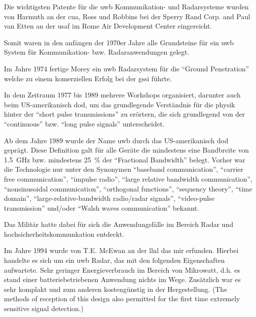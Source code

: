 Die wichtigsten Patente für die \ac{uwb} Kommunikation- und Radarsysteme wurden von Harmuth an der \ac{cua}, Ross und Robbins bei der Sperry Rand Corp. and Paul van Etten an der \ac{usaf} im Rome Air Development Center eingereicht. \cite{barrett2001technical}

\begin{comment}
Rome Laboratory (Rome Air Development Center until 1991) is the US "Air Force 'superlab' for command, control, and communications"[4] research and development and is responsible for planning and executing the USAF science and technology program.
\end{comment}

Somit waren in den anfängen der 1970er Jahre alle Grundsteine für ein \ac{uwb} System für Kommunikation- bzw. Radaranwendungen gelegt.\cite{barrett2001technical}

Im Jahre 1974 fertige Morey ein \ac{uwb} Radarsystem für die ``Ground Penetration'' welche zu einem komerziellen Erfolg bei der \ac{gssi} führte. \cite{barrett2001technical}

In dem Zeitraum 1977 bis 1989 mehrere Workshops organisiert, darunter auch beim US-ame­ri­ka­nisch \ac{dod}, um das grundlegende Verständnis für die physik hinter der ``short pulse transmissions'' zu erörtern, die sich grundlegend von der ``continuous'' bzw. ``long pulse signals'' unterscheidet. \cite{barrett2001technical}

Ab dem Jahre 1989 wurde der Name \ac{uwb} durch das US-ame­ri­ka­nisch \ac{dod} geprägt. Diese Definition galt für alle Geräte die mindestens eine Bandbreite von \SI{1.5}{\GHz} bzw. mindestens \SI{25}{\percent} der ``Fractional Bandwidth'' belegt. Vorher war die Technologie nur unter den Synonymen ``baseband communication'', ``carrier free communication'', ``impulse radio'', ``large relative bandwidth communication'', ``nonsinusoidal communication'', ``orthogonal functions'', ``sequency theory'', ``time domain'', ``large-relative-bandwidth radio/radar signals'', ``video-pulse transmission'' und/oder ``Walsh waves communication'' bekannt. \cite{eltaher2004positioning, fowler1990assessment, yang2004uwbcom, aiello2006ultra, fontana2004recent}

Das Militär hatte dabei für sich die Anwendungsfälle im Bereich Radar und hochsicherheitskommunkation entdeckt.\cite{eltaher2004positioning}

Im Jahre 1994 wurde von T.E. McEwan an der \ac{llnl} das \ac{mir} erfunden. Hierbei handelte es sich um ein \ac{uwb} Radar, das mit den folgenden Eigenschaften aufwartete. Sehr geringer Energieverbrauch im Bereich von Mikrowatt, d.h. es stand einer batteriebetriebenen Anwendung nichts im Wege. Zusätzlich war es sehr komplakt und zum anderen kostengünstig in der Hergestellung. (The methods of reception of this design also permitted for the first time extremely sensitive signal detection.) \cite{barrett2001technical}

